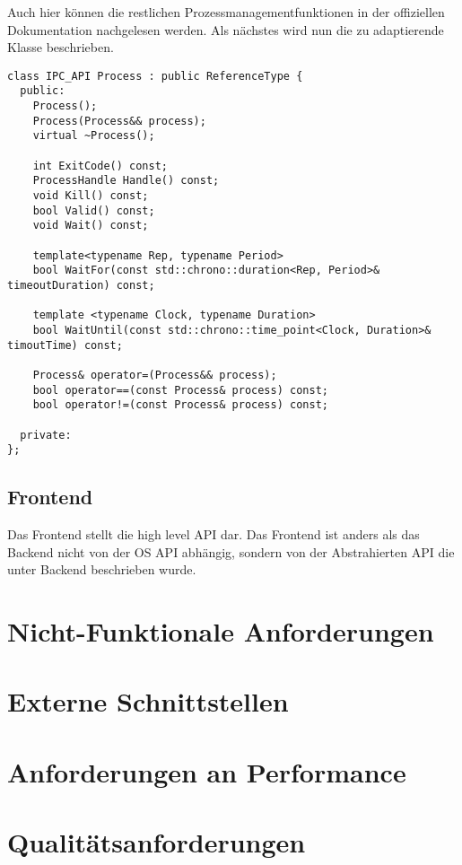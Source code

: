 \documentclass[a4paper]{book}
\begin{document}
\lstset{language=[GNU]C++}
\begin{lstlisting}[caption={fork},frame=single]
\end{lstlisting}

\noindent Auch hier können die restlichen Prozessmanagementfunktionen in der offiziellen Dokumentation nachgelesen werden. Als nächstes wird nun die zu adaptierende Klasse beschrieben.

\lstset{language=C++,breaklines=true}
\begin{lstlisting}[caption={class Process},frame=single]
class IPC_API Process : public ReferenceType {
  public:
    Process();
    Process(Process&& process);
    virtual ~Process();
    
    int ExitCode() const;
    ProcessHandle Handle() const;
    void Kill() const;
    bool Valid() const;
    void Wait() const;
    
    template<typename Rep, typename Period>
    bool WaitFor(const std::chrono::duration<Rep, Period>& timeoutDuration) const;
    
    template <typename Clock, typename Duration>
    bool WaitUntil(const std::chrono::time_point<Clock, Duration>& timoutTime) const;
    
    Process& operator=(Process&& process);
    bool operator==(const Process& process) const;
    bool operator!=(const Process& process) const;
    
  private:
};
\end{lstlisting}

\subsection{Frontend}
Das Frontend stellt die high level API dar. Das Frontend ist anders als das Backend nicht von der OS API abhängig, sondern von der Abstrahierten API die unter Backend beschrieben wurde.

\section{Nicht-Funktionale Anforderungen}
\blindtext

\section{Externe Schnittstellen}
\blindtext

\section{Anforderungen an Performance}
\blindtext

\section{Qualitätsanforderungen}
\blindtext
\end{document}

